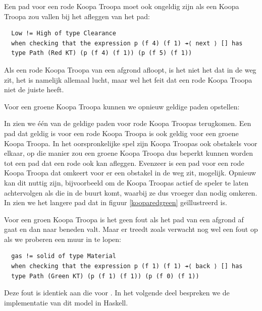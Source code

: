 Een pad voor een rode Koopa Troopa moet ook ongeldig zijn als een Koopa Troopa
zou vallen bij het afleggen van het pad:

\begin{verbatim}
  Low != High of type Clearance
  when checking that the expression p (f 4) (f 1) ↠⟨ next ⟩ [] has
  type Path (Red KT) (p (f 4) (f 1)) (p (f 5) (f 1))
\end{verbatim}

Als een rode Koopa Troopa van een afgrond afloopt, is het niet het
 dat in de weg zit, het is namelijk allemaal lucht, maar wel
het feit dat een rode Koopa Troopa niet de juiste  heeft.

Voor een groene Koopa Troopa kunnen we opnieuw geldige paden opstellen:


In  zien we één van de geldige paden voor rode Koopa
Troopas terugkomen. Een pad dat geldig is voor een rode Koopa Troopa is ook
geldig voor een groene Koopa Troopa. In het oorspronkelijke spel zijn Koopa
Troopas ook obstakels voor elkaar, op die manier zou een groene Koopa Troopa
dus beperkt kunnen worden tot een pad dat een rode ook kan afleggen. Evenzeer
is een pad voor een rode Koopa Troopa dat omkeert voor er een obstakel in de
weg zit, mogelijk. Opnieuw kan dit nuttig zijn, bijvoorbeeld om de Koopa
Troopas actief de speler te laten achtervolgen als die in de buurt komt,
waarbij ze dus vroeger dan nodig omkeren. In  zien we het
langere pad dat in figuur \ref{kooparedgreen} geïllustreerd is.

Voor een groen Koopa Troopa is het geen fout als het pad van een afgrond af
gaat en dan naar beneden valt. Maar er treedt zoals verwacht nog wel een fout
op als we proberen een muur in te lopen:


\begin{verbatim}
  gas != solid of type Material
  when checking that the expression p (f 1) (f 1) ↠⟨ back ⟩ [] has
  type Path (Green KT) (p (f 1) (f 1)) (p (f 0) (f 1))
\end{verbatim}

Deze fout is identiek aan die voor . In het volgende
deel bespreken we de implementatie van dit model in Haskell.


